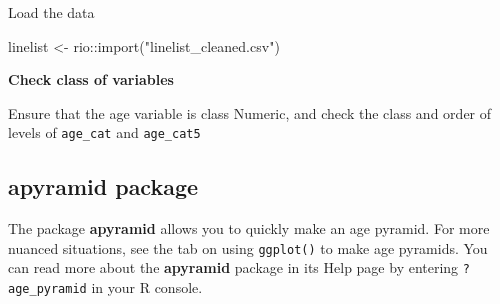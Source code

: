 \documentclass[
]{article}
\newenvironment{Shaded}{\begin{snugshade}}{\end{snugshade}}
\newcommand{\CommentTok}[1]{\textcolor[rgb]{0.50,0.62,0.50}{#1}}
\newcommand{\DataTypeTok}[1]{\textcolor[rgb]{0.87,0.87,0.75}{#1}}
\newcommand{\KeywordTok}[1]{\textcolor[rgb]{0.94,0.87,0.69}{#1}}
\newcommand{\NormalTok}[1]{\textcolor[rgb]{0.80,0.80,0.80}{#1}}
\newcommand{\OperatorTok}[1]{\textcolor[rgb]{0.94,0.94,0.82}{#1}}
\newcommand{\StringTok}[1]{\textcolor[rgb]{0.80,0.58,0.58}{#1}}
\begin{document}
Load the data

\begin{Shaded}
\begin{Highlighting}[]
\NormalTok{linelist \textless{}{-}}\StringTok{ }\NormalTok{rio}\OperatorTok{::}\KeywordTok{import}\NormalTok{(}\StringTok{"linelist\_cleaned.csv"}\NormalTok{)}
\end{Highlighting}
\end{Shaded}

\textbf{Check class of variables}

Ensure that the age variable is class Numeric, and check the class and
order of levels of \texttt{age\_cat} and \texttt{age\_cat5}

\begin{Shaded}
\end{Shaded}

\hypertarget{apyramid-package}{%
\subsection{\texorpdfstring{\textbf{apyramid}
package}{apyramid package}}\label{apyramid-package}}

The package \textbf{apyramid} allows you to quickly make an age pyramid.
For more nuanced situations, see the tab on using \texttt{ggplot()} to
make age pyramids. You can read more about the \textbf{apyramid} package
in its Help page by entering \texttt{?age\_pyramid} in your R console.
\end{document}
